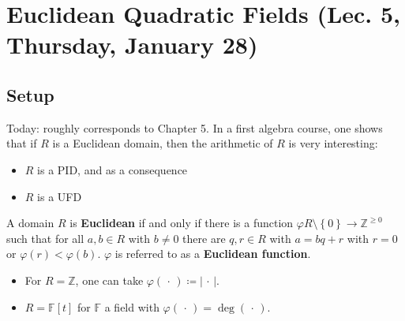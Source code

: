 \hypertarget{euclidean-quadratic-fields-lec.-5-thursday-january-28}{%
\section{Euclidean Quadratic Fields (Lec. 5, Thursday, January
28)}\label{euclidean-quadratic-fields-lec.-5-thursday-january-28}}

\hypertarget{setup}{%
\subsection{Setup}\label{setup}}

\begin{remark}

Today: roughly corresponds to Chapter 5. In a first algebra course, one
shows that if \(R\) is a Euclidean domain, then the arithmetic of \(R\)
is very interesting:

\begin{itemize}
\tightlist
\item
  \(R\) is a PID, and as a consequence
\item
  \(R\) is a UFD
\end{itemize}

\end{remark}

\begin{definition}

A domain \(R\) is \textbf{Euclidean} if and only if there is a function
\(\varphi R\setminus\left\{{0}\right\}\to {\mathbb{Z}}^{\geq 0}\) such
that for all \(a,b\in R\) with \(b\neq 0\) there are \(q, r\in R\) with
\(a = bq + r\) with \(r=0\) or \(\varphi(r) < \varphi(b)\). \(\varphi\)
is referred to as a \textbf{Euclidean function}.

\end{definition}

\begin{example}

\envlist

\begin{itemize}
\tightlist
\item
  For \(R={\mathbb{Z}}\), one can take
  \(\varphi({\,\cdot\,}) \coloneqq{\left\lvert {{\,\cdot\,}} \right\rvert}\).
\item
  \(R = {\mathbb{F}}[t]\) for \({\mathbb{F}}\) a field with
  \(\varphi({\,\cdot\,}) = \deg({\,\cdot\,})\).
\end{itemize}

\end{example}


